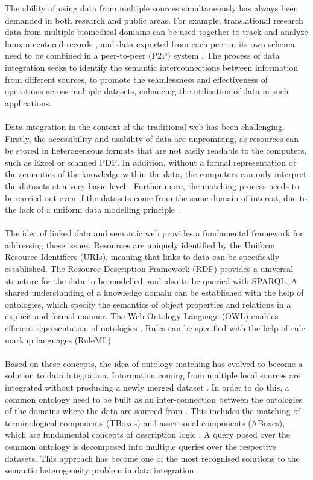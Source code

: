 \documentclass[a4paper,12pt,twoside]{article}
\begin{document}
The ability of using data from multiple sources simultaneously has always been demanded in both research and public areas. For example, translational research data from multiple biomedical domains can be used together to track and analyze human-centered records \cite{wang2009translational}, and data exported from each peer in its own schema need to be combined in a peer-to-peer (P2P) system \cite{calvanese2003semantic}. The process of data integration seeks to identify the semantic interconnections between information from different sources, to promote the seamlessness and effectiveness of operations across multiple datasets, enhancing the utilisation of data in such applications.
\\\\
Data integration in the context of the traditional web has been challenging. Firstly, the accessibility and usability of data are unpromising, as resources can be stored in heterogeneous formats that are not easily readable to the computers, such as Excel or scanned PDF. In addition, without a formal representation of the semantics of the knowledge within the data, the computers can only interpret the datasets at a very basic level \cite{shadbolt2006semantic}. Further more, the matching process needs to be carried out even if the datasets come from the same domain of interest, due to the lack of a uniform data modelling principle \cite{shvaiko2007ontology}.
\\\\
The idea of linked data and semantic web provides a fundamental framework for addressing these issues. Resources are uniquely identified by the Uniform Resource Identifiers (URIs), meaning that links to data can be specifically established. The Resource Description Framework (RDF) provides a universal structure for the data to be modelled, and also to be queried with SPARQL. A shared understanding of a knowledge domain can be established with the help of ontologies, which specify the semantics of object properties and relations in a explicit and formal manner. The Web Ontology Language (OWL) enables efficient representation of ontologies \cite{shadbolt2006semantic}. Rules can be specified with the help of rule markup languages (RuleML) \cite{horrocks2004swrl}.
\\\\
Based on these concepts, the idea of ontology matching has evolved to become a solution to data integration. Information coming from multiple local sources are integrated without producing a newly merged dataset \cite{wache2001ontology}. In order to do this, a common ontology need to be built as an inter-connection between the ontologies of the domains where the data are sourced from \cite{shvaiko2007ontology}. This includes the matching of terminological components (TBoxes) and assertional components (ABoxes), which are fundamental concepts of description logic \cite{baader2017introduction}. A query posed over the common ontology is decomposed into multiple queries over the respective datasets. This approach has become one of the most recognised solutions to the semantic heterogeneity problem in data integration \cite{vaishnavi2005semantic}.
\end{document}

